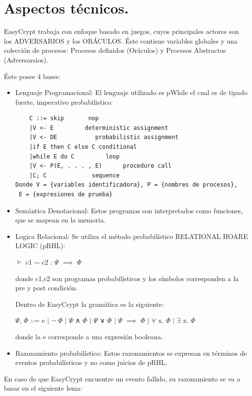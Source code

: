 \documentclass[runningheads,a4paper]{llncs}
\begin{document}
\section{Aspectos técnicos.}
EasyCrypt trabaja con enfoque basado en juegos, cuyos principales actores son los ADVERSARIOS y los ORÁCULOS. Éste contiene variables globales y una colección de procesos: Procesos definidos (Oráculos) y Procesos Abstractos (Adversarsios).

Éste posee 4 bases:
\begin{itemize}
	\item Lenguaje Programacional:
El lenguaje utilizado es pWhile el cual es de tipado fuerte, imperativo probabilistico:

\begin{Verbatim}
	C ::= skip		 nop
	|V <- E		    deterministic assignment
	|V <- DE		   probabilistic assignment
	|if E then C else C	conditional
	|while E do C	      loop
	|V <- P(E, . . . , E)      procedure call
	|C; C		      sequence
Donde V = {variables identificadora}, P = {nombres de procesos},
 E = {expresiones de prueba}
\end{Verbatim}

	\item Semántica Denotacional:
Estos programas son interpretados como funciones, que se mapean en la memoria.

	\item Logica Relacional: Se utiliza el método probabilístico RELATIONAL HOARE LOGIC (pRHL):
		
\centerline{$\models$ c1 $\sim$ c2 : $\Psi$ $\implies$ $\Phi$}	
			
donde c1,c2 son programas probabilísticos y los símbolos corresponden a la pre y post condición.

Dentro de EasyCrypt la gramática es la siguiente:

\centerline{$\Psi$, $\Phi$ ::= e $\mid$ $\neg$ $\Phi$ $\mid$ $\Psi$ ∧ $\Phi$ $\mid$ $\Psi$ ∨ $\Phi$ $\mid$ $\Psi$ $\implies$ $\Phi$ $\mid$ $\forall$ x. $\Phi$ $\mid$ $\exists$ x. $\Phi$}

donde la e corresponde a una expresión booleana.


	\item Razonamiento probabilístico:
Estos razonamientos se expresan en términos de eventos probabilísticos y no como juicios de pRHL.\cite{article3}

\end{itemize}
En caso de que EasyCrypt encuentre un evento fallido, su razonamiento se va a basar en el siguiente lema:
\end{document}
